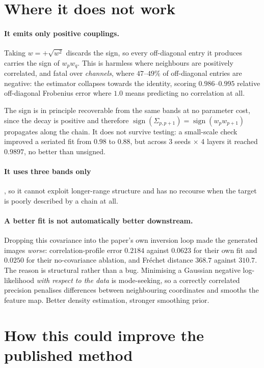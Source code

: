 \documentclass[11pt,a4paper]{article}
\begin{document}
\section{Where it does not work}
\label{sec:limits}

\paragraph{It emits only positive couplings.} Taking $w = +\sqrt{w^2}$ discards the sign, so
every off-diagonal entry it produces carries the sign of $w_p w_q$. This is harmless where
neighbours are positively correlated, and fatal over \emph{channels}, where $47$--$49\%$ of
off-diagonal entries are negative: the estimator collapses towards the identity, scoring
$0.986$--$0.995$ relative off-diagonal Frobenius error where $1.0$ means predicting no
correlation at all.

The sign is in principle recoverable from the same bands at no parameter cost, since the decay
is positive and therefore $\operatorname{sign}(\Sigma_{p,p+1}) = \operatorname{sign}(w_p
w_{p+1})$ propagates along the chain. It does not survive testing: a small-scale check improved
a seriated fit from $0.98$ to $0.88$, but across 3 seeds $\times$ 4 layers it reached $0.9897$,
no better than unsigned.

\paragraph{It uses three bands only}, so it cannot exploit longer-range structure and has no
recourse when the target is poorly described by a chain at all.

\paragraph{A better fit is not automatically better downstream.} Dropping this covariance into
the paper's own inversion loop made the generated images \emph{worse}: correlation-profile
error $0.2184$ against $0.0623$ for their own fit and $0.0250$ for their no-covariance
ablation, and Fr\'echet distance $368.7$ against $310.7$. The reason is structural rather than a
bug. Minimising a Gaussian negative log-likelihood \emph{with respect to the data} is
mode-seeking, so a correctly correlated precision penalises differences between neighbouring
coordinates and smooths the feature map. Better density estimation, stronger smoothing prior.

\section{How this could improve the published method}
\label{sec:improve}
\end{document}
